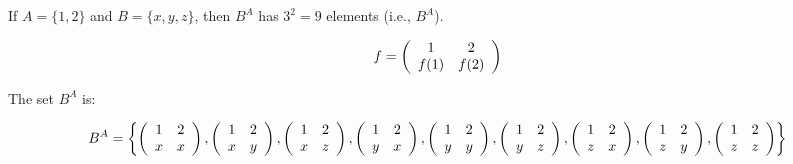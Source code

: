 \begin{example}
    If \( A = \{1, 2\} \) and \( B = \{x, y, z\} \), then \( B^A \) has \( 3^2 = 9 \) elements (i.e., \( B^A \)).

    \[
    f = \left( \begin{array}{c c}
    1 & 2 \\
    f(1) & f(2) \\
    \end{array} \right)
    \]

    The set \( B^A \) is:

    \[
    B^A = \left\{
    \left( \begin{array}{c c}
    1 & 2 \\
    x & x \\
    \end{array} \right),
    \left( \begin{array}{c c}
    1 & 2 \\
    x & y \\
    \end{array} \right),
    \left( \begin{array}{c c}
    1 & 2 \\
    x & z \\
    \end{array} \right),
    \left( \begin{array}{c c}
    1 & 2 \\
    y & x \\
    \end{array} \right),
    \left( \begin{array}{c c}
    1 & 2 \\
    y & y \\
    \end{array} \right),
    \left( \begin{array}{c c}
    1 & 2 \\
    y & z \\
    \end{array} \right),
    \left( \begin{array}{c c}
    1 & 2 \\
    z & x \\
    \end{array} \right),
    \left( \begin{array}{c c}
    1 & 2 \\
    z & y \\
    \end{array} \right),
    \left( \begin{array}{c c}
    1 & 2 \\
    z & z \\
    \end{array} \right)
    \right\}
    \]
\end{example}

